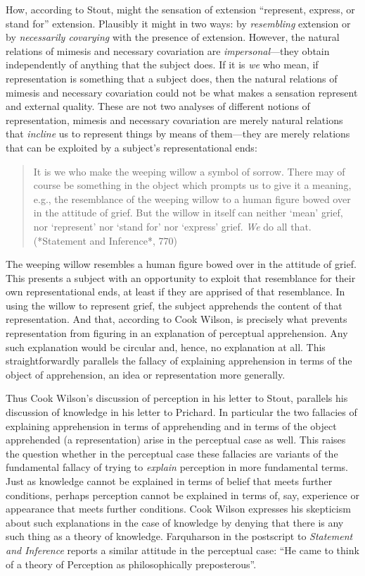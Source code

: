 \documentclass[11pt]{article}
\begin{document}
How, according to Stout, might the sensation of extension ``represent, express, or stand for'' extension. Plausibly it might in two ways: by \emph{resembling} extension or by \emph{necessarily covarying} with the presence of extension. However, the natural relations of mimesis and necessary covariation are \emph{impersonal}---they obtain independently of anything that the subject does. If it is \emph{we} who mean, if representation is something that a subject does, then the natural relations of mimesis and necessary covariation could not be what makes a sensation represent and external quality. These are not two analyses of different notions of representation, mimesis and necessary covariation are merely natural relations that \emph{incline} us to represent things by means of them---they are merely relations that can be exploited by a subject's representational ends:
\begin{quote}
	It is we who make the weeping willow a symbol of sorrow. There may of course be something in the object which prompts us to give it a meaning, e.g., the resemblance of the weeping willow to a human figure bowed over in the attitude of grief. But the willow in itself can neither `mean' grief, nor `represent' nor `stand for' nor `express' grief. \emph{We} do all that. (*Statement and Inference*, 770)
\end{quote}
The weeping willow resembles a human figure bowed over in the attitude of grief. This presents a subject with an opportunity to exploit that resemblance for their own representational ends, at least if they are apprised of that resemblance. In using the willow to represent grief, the subject apprehends the content of that representation. And that, according to Cook Wilson, is precisely what prevents representation from figuring in an explanation of perceptual apprehension. Any such explanation would be circular and, hence, no explanation at all. This straightforwardly parallels the fallacy of explaining apprehension in terms of the object of apprehension, an idea or representation more generally.

Thus Cook Wilson's discussion of perception in his letter to Stout, parallels his discussion of knowledge in his letter to Prichard. In particular the two fallacies of explaining apprehension in terms of apprehending and in terms of the object apprehended (a representation) arise in the perceptual case as well. This raises the question whether in the perceptual case these fallacies are variants of the fundamental fallacy of trying to \emph{explain} perception in more fundamental terms. Just as knowledge cannot be explained in terms of belief that meets further conditions, perhaps perception cannot be explained in terms of, say, experience or appearance that meets further conditions. Cook Wilson expresses his skepticism about such explanations in the case of knowledge by denying that there is any such thing as a theory of knowledge. Farquharson in the postscript to \emph{Statement and Inference} reports a similar attitude in the perceptual case: ``He came to think of a theory of Perception as philosophically preposterous''. 
\end{document}
